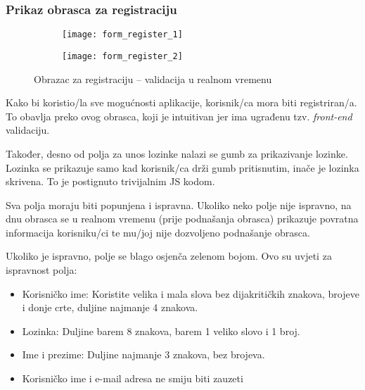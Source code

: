     \subsubsection{Prikaz obrasca za registraciju}

      \begin{figure}[h]
          \begin{subfigure}{0.5\textwidth}
            \texttt{[image: form\_register\_1]}
          \end{subfigure}
          \begin{subfigure}{0.5\textwidth}
            \texttt{[image: form\_register\_2]}
          \end{subfigure}

          \caption{Obrazac za registraciju -- validacija u realnom vremenu}
      \end{figure}

      Kako bi koristio/la sve mogućnosti aplikacije, korisnik/ca mora biti
      registriran/a. To obavlja preko ovog obrasca, koji je intuitivan jer ima
      ugrađenu tzv. \textit{front-end} validaciju.

      Također, desno od polja za unos lozinke nalazi se gumb za prikazivanje
      lozinke. Lozinka se prikazuje samo kad korisnik/ca drži gumb pritisnutim,
      inače je lozinka skrivena. To je postignuto trivijalnim JS kodom.

      Sva polja moraju biti popunjena i ispravna. Ukoliko neko polje nije ispravno,
      na dnu obrasca se u realnom vremenu (prije podnašanja obrasca) prikazuje
      povratna informacija korisniku/ci te mu/joj nije dozvoljeno podnašanje
      obrasca.

      Ukoliko je ispravno, polje se blago osjenča zelenom bojom. Ovo su uvjeti za
      ispravnost polja:

      \begin{itemize}
        \item Korisničko ime: Koristite velika i mala slova bez dijakritičkih
        znakova, brojeve i donje crte, duljine najmanje 4 znakova.
        \item Lozinka: Duljine barem 8 znakova, barem 1 veliko slovo i 1 broj.
        \item Ime i prezime: Duljine najmanje 3 znakova, bez brojeva.
        \item Korisničko ime i e-mail adresa ne smiju biti zauzeti
      \end{itemize}

